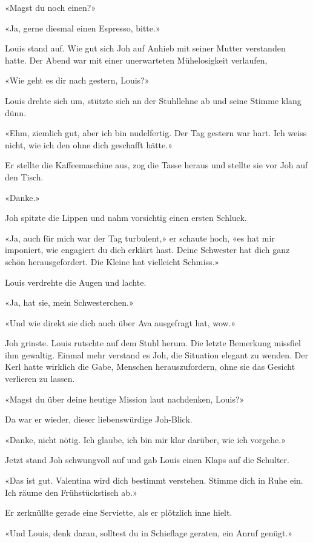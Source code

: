 «Magst du noch einen?»

«Ja, gerne diesmal einen Espresso, bitte.»

Louis stand auf.
Wie gut sich Joh auf Anhieb mit seiner Mutter verstanden hatte. 
Der Abend war mit einer unerwarteten Mühelosigkeit verlaufen, 

«Wie geht es dir nach gestern, Louis?»

Louis drehte sich um, stützte sich an der Stuhllehne ab und seine Stimme
klang dünn.

«Ehm, ziemlich gut, aber ich bin nudelfertig. Der Tag gestern war hart.
Ich weiss nicht, wie ich den ohne dich geschafft hätte.»

Er stellte die Kaffeemaschine aus, zog die Tasse heraus und stellte sie
vor Joh auf den Tisch.

«Danke.»

Joh spitzte die Lippen und nahm vorsichtig einen ersten Schluck.

«Ja, auch für mich war der Tag turbulent,» er schaute hoch, «es hat mir imponiert, wie engagiert du dich erklärt hast. Deine Schwester hat dich ganz schön herausgefordert. Die Kleine hat vielleicht Schmiss.»

Louis verdrehte die Augen und lachte.

«Ja, hat sie, mein Schwesterchen.»

«Und wie direkt sie dich auch über Ava ausgefragt hat, wow.»

Joh grinste.
Louis rutschte auf dem Stuhl herum. Die letzte Bemerkung missfiel ihm gewaltig. Einmal mehr verstand es Joh, die Situation elegant zu wenden. Der Kerl hatte wirklich die Gabe, Menschen herauszufordern, ohne sie das Gesicht verlieren zu lassen.

«Magst du über deine heutige Mission laut nachdenken, Louis?»

Da war er wieder, dieser liebenswürdige Joh-Blick.

«Danke, nicht nötig. Ich glaube, ich bin mir klar darüber, wie ich
vorgehe.»

Jetzt stand Joh schwungvoll auf und gab Louis einen Klaps auf die
Schulter.

«Das ist gut. Valentina wird dich bestimmt verstehen. Stimme dich in
Ruhe ein. Ich räume den Frühstückstisch ab.»

Er zerknüllte gerade eine Serviette, als er plötzlich inne hielt.

«Und Louis, denk daran, solltest du in Schieflage geraten, ein Anruf
genügt.»

